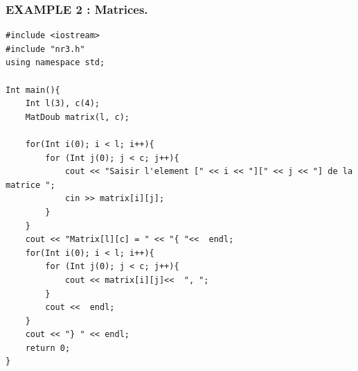 \documentclass[12pt]{report}
\begin{document}
\subsubsection{EXAMPLE 2 : Matrices.}

\begin{lstlisting}[style=CStyle]
#include <iostream>
#include "nr3.h"
using namespace std;

Int main(){
	Int l(3), c(4);
	MatDoub matrix(l, c);
	
	for(Int i(0); i < l; i++){
		for (Int j(0); j < c; j++){
			cout << "Saisir l'element [" << i << "][" << j << "] de la matrice ";
			cin >> matrix[i][j];
		}
	}
	cout << "Matrix[l][c] = " << "{ "<<  endl;
	for(Int i(0); i < l; i++){
		for (Int j(0); j < c; j++){
			cout << matrix[i][j]<<  ", ";			
		}
		cout <<  endl;
	} 
	cout << "} " << endl;
	return 0;
}

\end{lstlisting}

\newpage



\end{document}

